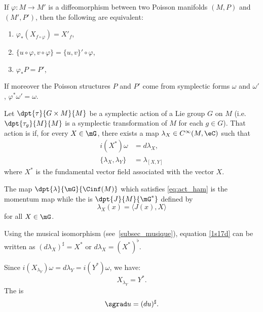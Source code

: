 \begin{theorem}\label{tho:equiv_Poisson}
	If $\varphi\colon M\to M'$ is a diffeomorphism between two Poisson manifolds $(M,P)$ and $(M',P')$, then the following are equivalent:
	\begin{enumerate}
		\item $\varphi_*(X_{f\circ\varphi})=X'_f$,
		      \item\label{ite_equivii} $\{u\circ\varphi,v\circ\varphi\}=\{u,v\}'\circ\varphi$,
		\item $\varphi_*P=P'$,
	\end{enumerate}
	If moreover the Poisson structures $P$ and $P'$ come from symplectic forms $\omega$ and $\omega'$, $\varphi^*\omega'=\omega$.
\end{theorem}

\begin{definition}
	Let $\dpt{\tau}{G\times M}{M}$ be a symplectic action of a Lie group $G$ on $M$ (i.e. $\dpt{\tau_g}{M}{M}$ is a symplectic transformation of $M$ for each $g\in G$). That action is  if, for every $X\in\mG$, there exists a map $\lambda_X\in C^{\infty}(M,\eC)$ such that
	\begin{subequations}\label{eq:act_ham}
		\begin{align}
			i(X^*)\omega            & =d\lambda_X,\label{1s17d}        \\
			\{\lambda_X,\lambda_Y\} & =\lambda_{[X,Y]}\label{eq:hamil}
		\end{align}
	\end{subequations}
	where $X^*$ is the fundamental vector field associated with the vector $X$.
\end{definition}

\begin{definition}
	The map $\dpt{\lambda}{\mG}{\Cinf(M)}$ which satisfies \eqref{eq:act_ham} is the  momentum map while the  is $\dpt{J}{M}{\mG^*}$ defined by
	\begin{equation} \label{eq:defmomm ap}
		\lambda_X(x)=\langle J(x),X\rangle
	\end{equation}
	for all $X\in\mG$.
	\label{def:app_mom_mom_duale}
\end{definition}
Using the musical isomorphism (see~\ref{subsec_musique}), equation \eqref{1s17d} can be written as $(d\lambda_X)^{\sharp}=X^*$ or $d\lambda_X=(X^*)^{\flat}$.

Since $i(X_{\lambda_Y})\omega=d\lambda_Y=i(Y^*)\omega$, we have:
\begin{equation} \label{eq_XlambdaYs}
	X_{\lambda_Y}=Y^*.
\end{equation}
The  is
\[
	\sgrad u=(du)^{\sharp}.
\]

